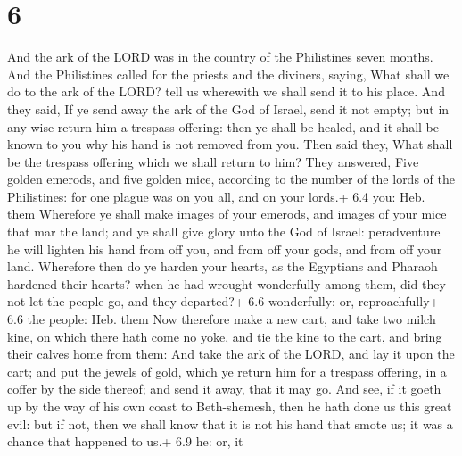 \hypertarget{section-5}{%
\section{6}\label{section-5}}

 And the ark of the LORD was in the country of the
Philistines seven months.  And the Philistines called for
the priests and the diviners, saying, What shall we do to the ark of the
LORD? tell us wherewith we shall send it to his place.  And
they said, If ye send away the ark of the God of Israel, send it not
empty; but in any wise return him a trespass offering: then ye shall be
healed, and it shall be known to you why his hand is not removed from
you.  Then said they, What shall be the trespass offering
which we shall return to him? They answered, Five golden emerods, and
five golden mice, according to the number of the lords of the
Philistines: for one plague was on you all, and on your lords.+ 6.4 you:
Heb. them  Wherefore ye shall make images of your emerods,
and images of your mice that mar the land; and ye shall give glory unto
the God of Israel: peradventure he will lighten his hand from off you,
and from off your gods, and from off your land.  Wherefore
then do ye harden your hearts, as the Egyptians and Pharaoh hardened
their hearts? when he had wrought wonderfully among them, did they not
let the people go, and they departed?+ 6.6 wonderfully: or,
reproachfully+ 6.6 the people: Heb. them  Now therefore make
a new cart, and take two milch kine, on which there hath come no yoke,
and tie the kine to the cart, and bring their calves home from them:
 And take the ark of the LORD, and lay it upon the cart; and
put the jewels of gold, which ye return him for a trespass offering, in
a coffer by the side thereof; and send it away, that it may go.
 And see, if it goeth up by the way of his own coast to
Beth-shemesh, then he hath done us this great evil: but if not, then we
shall know that it is not his hand that smote us; it was a chance that
happened to us.+ 6.9 he: or, it

